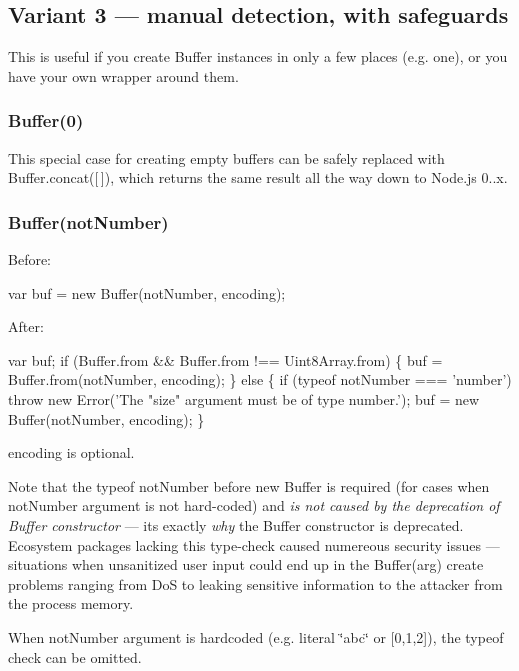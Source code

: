 \subsection*{Variant 3 — manual detection, with safeguards}

This is useful if you create Buffer instances in only a few places (e.\+g. one), or you have your own wrapper around them.

\subsubsection*{Buffer(0)}

This special case for creating empty buffers can be safely replaced with {\ttfamily Buffer.\+concat(\mbox{[}$\,$\mbox{]})}, which returns the same result all the way down to Node.\+js 0..\+x.

\subsubsection*{Buffer(not\+Number)}

Before\+:


\begin{DoxyCode}
var buf = new Buffer(notNumber, encoding);
\end{DoxyCode}


After\+:


\begin{DoxyCode}
var buf;
if (Buffer.from && Buffer.from !== Uint8Array.from) \{
  buf = Buffer.from(notNumber, encoding);
\} else \{
  if (typeof notNumber === 'number')
    throw new Error('The "size" argument must be of type number.');
  buf = new Buffer(notNumber, encoding);
\}
\end{DoxyCode}


{\ttfamily encoding} is optional.

Note that the {\ttfamily typeof not\+Number} before {\ttfamily new Buffer} is required (for cases when {\ttfamily not\+Number} argument is not hard-\/coded) and {\itshape is not caused by the deprecation of Buffer constructor} — it\textquotesingle{}s exactly {\itshape why} the Buffer constructor is deprecated. Ecosystem packages lacking this type-\/check caused numereous security issues — situations when unsanitized user input could end up in the {\ttfamily Buffer(arg)} create problems ranging from DoS to leaking sensitive information to the attacker from the process memory.

When {\ttfamily not\+Number} argument is hardcoded (e.\+g. literal {\ttfamily \char`\"{}abc\char`\"{}} or {\ttfamily \mbox{[}0,1,2\mbox{]}}), the {\ttfamily typeof} check can be omitted.

